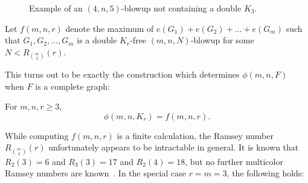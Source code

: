 \begin{center}
  \setcounter{figure}{0}

  \begin{figure}[htbp]
    \centering
    \caption{Example of an $(4, n, 5)$-blowup not containing a double $K_3$.}
    \label{fig:blowup}
  \end{figure}
\end{center}

\begin{definition}
  Let $f(m, n, r)$ denote the maximum of $e(G_1) + e(G_2) + \dots + e(G_m)$ such that $G_1, G_2, \dots, G_m$ is a double $K_r$-free $(m, n, N)$-blowup for some $N < R_{\binom{m}{2}}(r)$.
\end{definition}

This turns out to be exactly the construction which determines $\phi(m, n, F)$ when $F$ is a complete graph: 

\begin{theorem}\label{thm:blowup}
  For $m, n, r \geq 3$, 
  \[ 
    \phi(m, n, K_r) = f(m, n, r).
  \]
\end{theorem}

While computing $f(m, n, r)$ is a finite calculation, the Ramsey number $R_{\binom{m}{2}}(r)$ unfortunately appears to be intractable in general. It is known that $R_2(3) = 6$ and $R_3(3) = 17$ and $R_2(4) = 18$, but no further multicolor Ramsey numbers are known~\cite{ConlonFerber2021,Lefmann1987}. In the special case $r = m = 3$, the following holds: 

